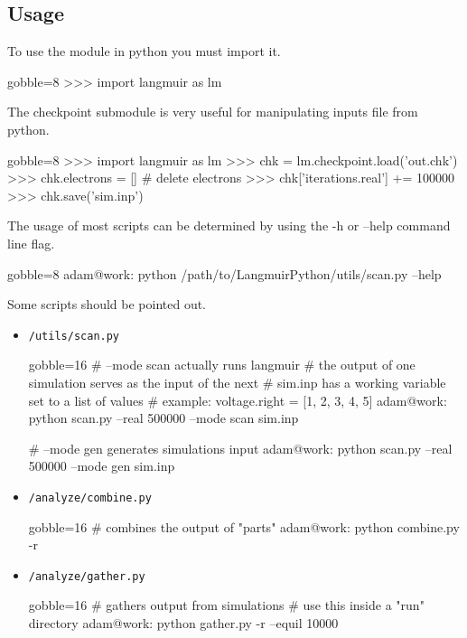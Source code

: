 \subsection{Usage}
    To use the \langmuir module in python you must import it.
    \begin{pythoncode*}{gobble=8}
        >>> import langmuir as lm
    \end{pythoncode*}

    The checkpoint submodule is very useful for manipulating inputs
        file from python.
    \begin{pythoncode*}{gobble=8}
        >>> import langmuir as lm
        >>> chk = lm.checkpoint.load('out.chk')
        >>> chk.electrons = [] # delete electrons
        >>> chk['iterations.real'] += 100000
        >>> chk.save('sim.inp')
    \end{pythoncode*}

    The usage of most scripts can be determined by using the -h or
        --help command line flag.
    \begin{bashcode*}{gobble=8}
        adam@work: python /path/to/LangmuirPython/utils/scan.py --help
    \end{bashcode*}

    Some scripts should be pointed out.
    \begin{itemize}
        \item \verb|/utils/scan.py|
            \begin{bashcode*}{gobble=16}
                # --mode scan actually runs langmuir
                # the output of one simulation serves as the input of the next
                # sim.inp has a working variable set to a list of values
                # example: voltage.right = [1, 2, 3, 4, 5]
                adam@work: python scan.py --real 500000 --mode scan sim.inp

                # --mode gen generates simulations input
                adam@work: python scan.py --real 500000 --mode gen sim.inp
            \end{bashcode*}
        \item \verb|/analyze/combine.py|
            \begin{bashcode*}{gobble=16}
                # combines the output of "parts"
                adam@work: python combine.py -r
            \end{bashcode*}
        \item \verb|/analyze/gather.py|
            \begin{bashcode*}{gobble=16}
                # gathers output from simulations
                # use this inside a "run" directory
                adam@work: python gather.py -r --equil 10000
            \end{bashcode*}
    \end{itemize}

